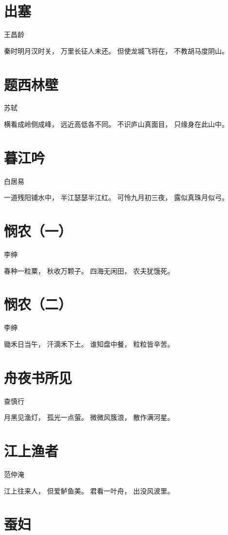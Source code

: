 \documentclass[12pt,UTF8]{ctexbook}
\begin{document}
\section{出塞}

王昌龄

秦时明月汉时关，
万里长征人未还。
但使龙城飞将在，
不教胡马度阴山。

\section{题西林壁}

苏轼

横看成岭侧成峰，
远近高低各不同。
不识庐山真面目，
只缘身在此山中。

\section{暮江吟}

白居易

一道残阳铺水中，
半江瑟瑟半江红。
可怜九月初三夜，
露似真珠月似弓。

\section{悯农（一）}

李绅

春种一粒粟，
秋收万颗子。
四海无闲田，
农夫犹饿死。

\section{悯农（二）}

李绅

锄禾日当午，
汗滴禾下土。
谁知盘中餐，
粒粒皆辛苦。

\section{舟夜书所见} 

查慎行

月黑见渔灯，
孤光一点萤。
微微风簇浪，
散作满河星。

\section{江上渔者}

范仲淹

江上往来人，
但爱鲈鱼美。
君看一叶舟，
出没风波里。

\section{蚕妇}
\end{document}
